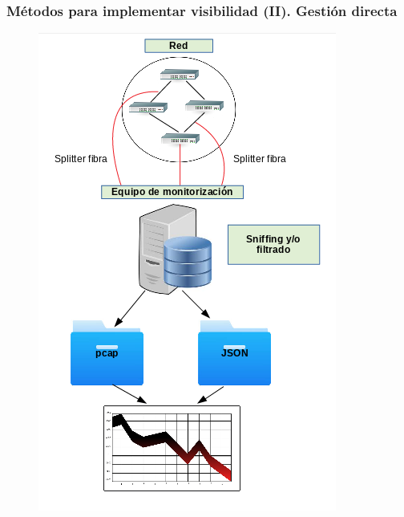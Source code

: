 \documentclass{beamer}
\begin{document}
\begin{frame}
\frametitle{Métodos para implementar visibilidad (II). Gestión directa}

\begin{figure}[H]
	\centering
	\includegraphics[scale=0.35]{directo.png}
	\label{directo}
\end{figure}

\end{frame}
\end{document}

